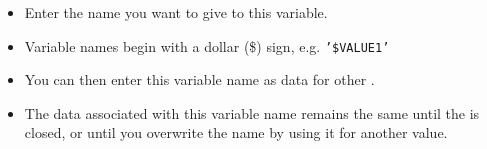 
\begin{itemize}
\item Enter the name you want to give to this variable. 
\item Variable names begin with a dollar (\$) sign, e.g. {\tt '\$VALUE1'}
\item You can then enter this variable name as data for other \gdsteps{}. 
\item The data associated with this variable name remains the same until the \gdproject{} is closed, or until you overwrite the name by using it for another value. 
\end{itemize}

